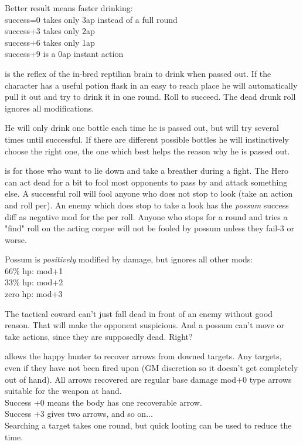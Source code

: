 Better result means faster drinking:\\
success=0 takes only 3ap instead of a full round\\
success+3 takes only 2ap\\
success+6 takes only 1ap\\
success+9 is a 0ap instant action


 is the reflex of the in-bred reptilian brain to drink when passed out. If the character has a useful potion flask in an easy to reach place he will automatically pull it out and try to drink it in one round. Roll to succeed. The dead drunk roll ignores all modifications.

He will only drink one bottle each time he is passed out, but will try several times until successful. If there are different possible bottles he will instinctively choose the right one, the one which best helps the reason why he is passed out.


 is for those who want to lie down and take a breather during a fight. The Hero can act dead for a bit to fool most opponents to pass by and attack something else. A successful roll will fool anyone who does not stop to look (take an action and roll per). An enemy which does stop to take a look has the \emph{possum} success diff as negative mod for the per roll. Anyone who stops for a round and tries a "find" roll on the acting corpse will not be fooled by possum unless they fail-3 or worse.

Possum is \emph{positively} modified by damage, but ignores all other mods:\\
66\% hp: mod+1\\
33\% hp: mod+2\\
zero hp: mod+3

The tactical coward can't just fall dead in front of an enemy without good reason. That will make the opponent suspicious. And a possum can't move or take actions, since they are supposedly dead. Right?


 allows the happy hunter to recover arrows from downed targets. Any targets, even if they have not been fired upon (GM discretion so it doesn't get completely out of hand). All arrows recovered are regular base damage mod+0 type arrows suitable for the weapon at hand.\\
Success +0 means the body has one recoverable arrow. \\
Success +3 gives two arrows, and so on...\\
Searching a target takes one round, but quick looting can be used to reduce the time.

